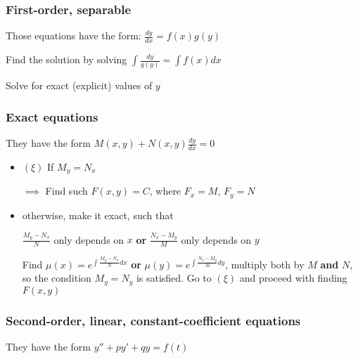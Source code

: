 \documentclass[12pt]{article}
\begin{document}
\subsubsection*{First-order, separable}
\label{sec:org1bac79d}

Those equations have the form: \(\frac{dy}{dx} = f(x)g(y)\)

Find the solution by solving \(\int \frac{dy}{g(y)} = \int f(x) dx\)

Solve for exact (explicit) values of \(y\)

\subsubsection*{Exact equations}
\label{sec:org47a1f4f}

They have the form \(M(x,y) + N(x,y) \frac{dy}{dx} = 0\)

\begin{itemize}
\item \((\xi)\) If \(M_y = N_x\)

\(\implies\) Find such \(F(x,y)=C\), where \(F_x = M\), \(F_y = N\)

\item otherwise, make it exact, such that

\(\frac{M_y-N_x}{N}\) only depends on \(x\) \textbf{or} \(\frac{N_x-M_y}{M}\) only
depends on \(y\) 

Find \(\mu(x) = e^{\int \frac{M_y-N_x}{N} dx}\) \textbf{or}
\(\mu(y) = e^{\int \frac{N_x-M_y}{M} dy}\), multiply both by \(M\) \textbf{and} \(N\),
so the condition \(M_y = N_y\) is satisfied. Go to \((\xi)\) and proceed with
finding \(F(x,y)\)
\end{itemize}

\subsubsection*{Second-order, linear, constant-coefficient equations}
\label{sec:org9f4225c}

They have the form \(y'' + p y' + q y = f(t)\)
\end{document}
